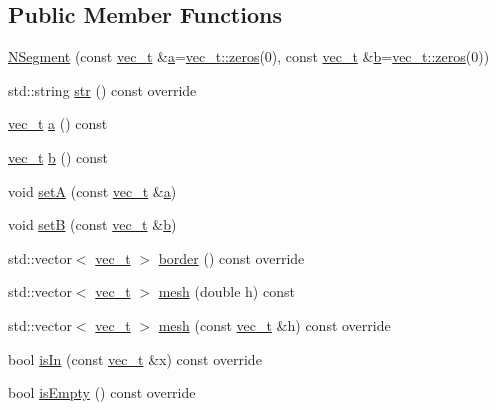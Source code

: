 \subsection*{Public Member Functions}
\begin{DoxyCompactItemize}
\item 
\mbox{\hyperlink{class_n_segment_a15b93ff64168dac284abf4144148b194}{N\+Segment}} (const \mbox{\hyperlink{group___n_algebra_ga0a2cfc67e738a3d73e4f12098c4c07f6}{vec\+\_\+t}} \&\mbox{\hyperlink{class_n_segment_a7a4eccaa9a0746ef758efdde1bfbbd65}{a}}=\mbox{\hyperlink{class_n_vector_a6253cef3c39dd9d388bbf7d17069bc51}{vec\+\_\+t\+::zeros}}(0), const \mbox{\hyperlink{group___n_algebra_ga0a2cfc67e738a3d73e4f12098c4c07f6}{vec\+\_\+t}} \&\mbox{\hyperlink{class_n_segment_aa782c4870899db28cae39616edc86967}{b}}=\mbox{\hyperlink{class_n_vector_a6253cef3c39dd9d388bbf7d17069bc51}{vec\+\_\+t\+::zeros}}(0))
\item 
std\+::string \mbox{\hyperlink{class_n_segment_a15514dec8420dd1aafda38e7327c9be0}{str}} () const override
\item 
\mbox{\hyperlink{group___n_algebra_ga0a2cfc67e738a3d73e4f12098c4c07f6}{vec\+\_\+t}} \mbox{\hyperlink{class_n_segment_a7a4eccaa9a0746ef758efdde1bfbbd65}{a}} () const
\item 
\mbox{\hyperlink{group___n_algebra_ga0a2cfc67e738a3d73e4f12098c4c07f6}{vec\+\_\+t}} \mbox{\hyperlink{class_n_segment_aa782c4870899db28cae39616edc86967}{b}} () const
\item 
void \mbox{\hyperlink{class_n_segment_a423242ff6d7d28acbf6bb0fffb559163}{setA}} (const \mbox{\hyperlink{group___n_algebra_ga0a2cfc67e738a3d73e4f12098c4c07f6}{vec\+\_\+t}} \&\mbox{\hyperlink{class_n_segment_a7a4eccaa9a0746ef758efdde1bfbbd65}{a}})
\item 
void \mbox{\hyperlink{class_n_segment_a02094cbbe46d7c647299ecdde05ce592}{setB}} (const \mbox{\hyperlink{group___n_algebra_ga0a2cfc67e738a3d73e4f12098c4c07f6}{vec\+\_\+t}} \&\mbox{\hyperlink{class_n_segment_aa782c4870899db28cae39616edc86967}{b}})
\item 
std\+::vector$<$ \mbox{\hyperlink{group___n_algebra_ga0a2cfc67e738a3d73e4f12098c4c07f6}{vec\+\_\+t}} $>$ \mbox{\hyperlink{class_n_segment_a0ef102ed1c0751ae4a9a2e52bf0736da}{border}} () const override
\item 
std\+::vector$<$ \mbox{\hyperlink{group___n_algebra_ga0a2cfc67e738a3d73e4f12098c4c07f6}{vec\+\_\+t}} $>$ \mbox{\hyperlink{class_n_segment_a49473aeaa477736a7863e60607e045e0}{mesh}} (double h) const
\item 
std\+::vector$<$ \mbox{\hyperlink{group___n_algebra_ga0a2cfc67e738a3d73e4f12098c4c07f6}{vec\+\_\+t}} $>$ \mbox{\hyperlink{class_n_segment_ad89a4122b800b15f465f5ca776394721}{mesh}} (const \mbox{\hyperlink{group___n_algebra_ga0a2cfc67e738a3d73e4f12098c4c07f6}{vec\+\_\+t}} \&h) const override
\item 
bool \mbox{\hyperlink{class_n_segment_a9370351370e57d265f990b3e9d2ab114}{is\+In}} (const \mbox{\hyperlink{group___n_algebra_ga0a2cfc67e738a3d73e4f12098c4c07f6}{vec\+\_\+t}} \&x) const override
\item 
bool \mbox{\hyperlink{class_n_segment_ac17e9542c20477269bbcf08286d79d07}{is\+Empty}} () const override
\end{DoxyCompactItemize}
